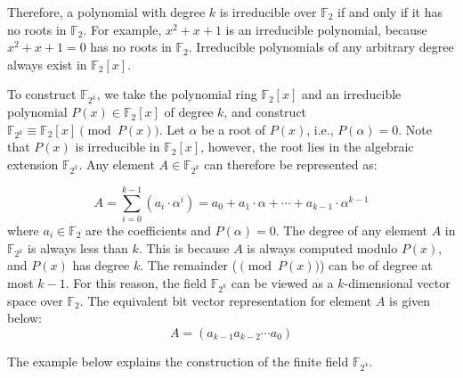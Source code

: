 Therefore, a polynomial with degree $k$ is irreducible over $\mathbb{F}_{2}$ if and only if it has no roots in $\mathbb{F}_{2}$. 
For example, $x^2+x+1$ is an irreducible polynomial, because $x^2+x+1=0$ has no roots in $\mathbb{F}_{2}$.
Irreducible polynomials of any arbitrary degree always exist in $\mathbb{F}_2[x]$.

To construct $\mathbb{F}_{2^k}$, we take the polynomial ring $\mathbb{F}_2[x]$ and an irreducible polynomial
$P(x) \in \mathbb{F}_2[x]$ of degree $k$, and construct $\mathbb{F}_{2^k} \equiv \mathbb{F}_2[x] \pmod{ P(x)}$.
Let $\alpha$ be a root of $P(x)$, i.e., $P(\alpha)=0$.
Note that $P(x)$ is irreducible in  $\mathbb{F}_{2}[x]$, however, the root lies in the algebraic extension $\mathbb{F}_{2^k}$.
Any element $A \in \mathbb{F}_{2^k}$ can therefore be represented as:

\begin{equation}\label{rep:poly}
A= \sum_{i=0}^{k-1} (a_i \cdot \alpha^i) = a_0 + a_1\cdot\alpha + \cdots + a_{k-1}\cdot \alpha^{k-1}
\end{equation}
where $a_i \in \mathbb{F}_2$ are the coefficients and $P(\alpha)=0$. 
The degree of any element $A$ in $\mathbb{F}_{2^k}$ is always less than $k$. 
This is because $A$ is always computed modulo $P(x)$, and $P(x)$ has degree $k$. 
The remainder ($\pmod {P(x)}$) can be of degree at most $k-1$.
For this reason, the field $\mathbb{F}_{2^k}$ can be viewed as a $k$-dimensional vector space over $\mathbb{F}_{2}$. 
The equivalent bit vector representation for element $A$ is given below:
\begin{equation}
A=(a_{k-1}a_{k-2}\cdots a_{0})
\end{equation}

The example below explains the construction of the finite field $\mathbb{F}_{2^4}$.

